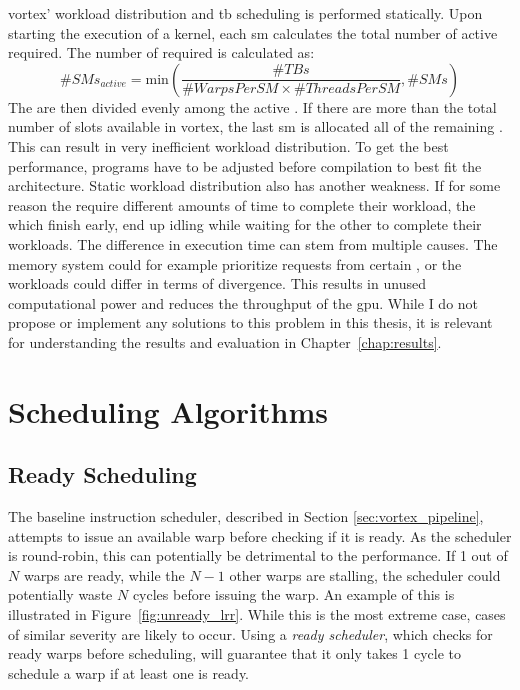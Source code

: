 \Gls{vortex}' workload distribution and \acrshort{tb} scheduling is performed statically. Upon starting the execution of a kernel, each \acrshort{sm} calculates the total number of active  required. The number of  required is calculated as:
\begin{equation}
    \#SMs_{active} = \text{min}(\frac{\#TBs}{\#WarpsPerSM \times \#ThreadsPerSM}, \#SMs)
\end{equation}
\noindent
The  are then divided evenly among the active . If there are more  than the total number of slots available in \Gls{vortex}, the last \acrshort{sm} is allocated all of the remaining . This can result in very inefficient workload distribution. To get the best performance, programs have to be adjusted before compilation to best fit the architecture. Static workload distribution also has another weakness. If for some reason the  require different amounts of time to complete their workload, the  which finish early, end up idling while waiting for the other  to complete their workloads. The difference in execution time can stem from multiple causes. The memory system could for example prioritize requests from certain , or the workloads could differ in terms of divergence. This results in unused computational power and reduces the throughput of the \acrshort{gpu}. While I do not propose or implement any solutions to this problem in this thesis, it is relevant for understanding the results and evaluation in Chapter~\ref{chap:results}.

\section{Scheduling Algorithms}

\subsection{Ready Scheduling} \label{sec:ready_scheduling}

The baseline instruction scheduler, described in Section \ref{sec:vortex_pipeline}, attempts to issue an available warp before checking if it is ready. As the scheduler is round-robin, this can potentially be detrimental to the performance. If 1 out of $N$ warps are ready, while the $N-1$ other warps are stalling, the scheduler could potentially waste $N$ cycles before issuing the warp. An example of this is illustrated in Figure~\ref{fig:unready_lrr}. While this is the most extreme case, cases of similar severity are likely to occur. Using a \textit{ready scheduler}, which checks for ready warps before scheduling, will guarantee that it only takes 1 cycle to schedule a warp if at least one is ready.

